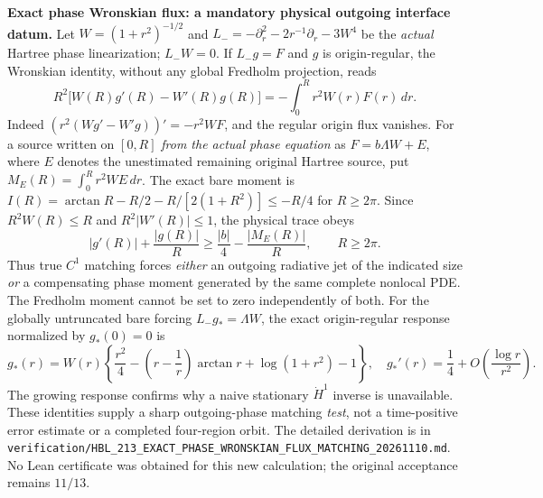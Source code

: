 \documentclass[11pt]{amsart}
\begin{document}
\medskip
\noindent\textbf{Exact phase Wronskian flux: a mandatory physical
outgoing interface datum.}
Let $W=(1+r^2)^{-1/2}$ and
$L_-=-\partial_r^2-2r^{-1}\partial_r-3W^4$ be the
\emph{actual} Hartree phase linearization; $L_-W=0$.
If $L_-g=F$ and $g$ is origin-regular, the Wronskian
identity, without any global Fredholm projection, reads
\[
 \boxed{\quad
 R^2\bigl[W(R)g'(R)-W'(R)g(R)\bigr]
 =-\int_0^Rr^2W(r)F(r)\,dr .
 \quad}
\]
Indeed $(r^2(Wg'-W'g))'=-r^2WF$, and the regular
origin flux vanishes.  For a source written on $[0,R]$
\emph{from the actual phase equation} as
$F=b\Lambda W+E$, where $E$ denotes the unestimated
remaining original Hartree source, put
$M_E(R)=\int_0^Rr^2WE\,dr$.  The exact bare moment is
$I(R)=\arctan R-R/2-R/[2(1+R^2)]\le-R/4$ for
$R\ge2\pi$.  Since $R^2W(R)\le R$ and
$R^2|W'(R)|\le1$, the physical trace obeys
\[
 \boxed{\quad
 |g'(R)|+\frac{|g(R)|}{R}
 \ge\frac{|b|}{4}-\frac{|M_E(R)|}{R},
 \qquad R\ge2\pi .
 \quad}
\]
Thus true $C^1$ matching forces \emph{either} an
outgoing radiative jet of the indicated size \emph{or}
a compensating phase moment generated by the
same complete nonlocal PDE.  The Fredholm moment
cannot be set to zero independently of both.
For the globally untruncated bare forcing
$L_-g_*=\Lambda W$, the exact origin-regular response
normalized by $g_*(0)=0$ is
\[
 g_*(r)=W(r)\left\{
 \frac{r^2}{4}
 -\left(r-\frac1r\right)\arctan r
 +\log(1+r^2)-1\right\},\quad
 g_*'(r)=\frac14+O\!\left(\frac{\log r}{r^2}\right).
\]
The growing response confirms why a naive stationary
$\dot H^1$ inverse is unavailable.  These identities
supply a sharp outgoing-phase matching \emph{test},
not a time-positive error estimate or a completed
four-region orbit.  The detailed derivation is in
\texttt{verification/HBL\_213\_EXACT\_PHASE\_WRONSKIAN\_FLUX\_MATCHING\_20261110.md}.
No Lean certificate was obtained for this new
calculation; the original acceptance remains $11/13$.
\end{document}

